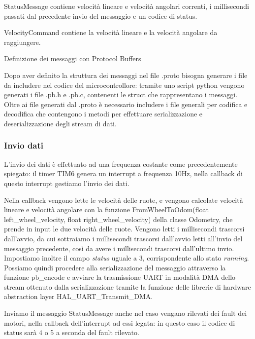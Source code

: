 StatusMessage contiene velocità lineare e velocità angolari correnti, i millisecondi passati dal precedente invio del messaggio e un codice di status.

VelocityCommand contiene la velocità lineare e la velocità angolare da raggiungere.

\begin{listing}[H]

\caption{Definizione dei messaggi con Protocol Buffers}
\label{listing:protobuf_definition}
\end{listing}


Dopo aver definito la struttura dei messaggi nel file .proto bisogna generare i file da includere nel codice del microcontrollore: tramite uno script python vengono generati i file .pb.h e .pb.c, contenenti le struct che rappresentano i messaggi. Oltre ai file generati dal .proto è necessario includere i file generali per codifica e decodifica che contengono i metodi per effettuare serializzazione e deserializzazione degli stream di dati.

\subsubsection{Invio dati}
L'invio dei dati è effettuato ad una frequenza costante come precedentemente spiegato: il timer TIM6 genera un interrupt a frequenza 10Hz, nella callback di questo interrupt gestiamo l'invio dei dati.

Nella callback vengono lette le velocità delle ruote, e vengono calcolate velocità lineare e velocità angolare con la funzione FromWheelToOdom(float left\_wheel\_velocity, float right\_wheel\_velocity) della classe Odometry, che prende in input le due velocità delle ruote. Vengono letti i millisecondi trascorsi dall'avvio, da cui sottraiamo i millisecondi trascorsi dall'avvio letti all'invio del messaggio precedente, così da avere i millisecondi trascorsi dall'ultimo invio. Impostiamo inoltre il campo \textit{status} uguale a 3, corrispondente allo stato \textit{running}.
Possiamo quindi procedere alla serializzazione del messaggio attraverso la funzione pb\_encode e avviare la trasmissione UART in modalità DMA dello stream ottenuto dalla serializzazione tramite la funzione delle librerie di hardware abstraction layer HAL\_UART\_Transmit\_DMA.

Inviamo il messaggio StatusMessage anche nel caso vengano rilevati dei fault dei motori, nella callback dell'interrupt ad essi legata: in questo caso il codice di status sarà 4 o 5 a seconda del fault rilevato.


